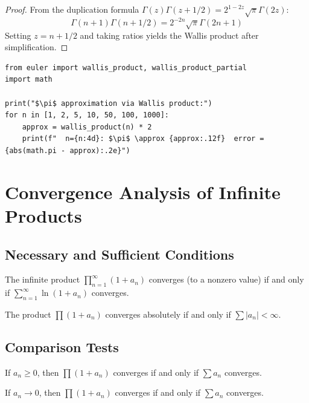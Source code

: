 \begin{proof}
From the duplication formula $\Gamma(z)\Gamma(z+1/2) = 2^{1-2z}\sqrt{\pi}\Gamma(2z)$:
\[
\Gamma(n+1)\Gamma(n+1/2) = 2^{-2n}\sqrt{\pi}\Gamma(2n+1)
\]
Setting $z = n+1/2$ and taking ratios yields the Wallis product after simplification.
\end{proof}

\begin{lstlisting}[caption={Wallis product for $\pi/2$}, label=lst:wallis]
from euler import wallis_product, wallis_product_partial
import math

print("$\pi$ approximation via Wallis product:")
for n in [1, 2, 5, 10, 50, 100, 1000]:
    approx = wallis_product(n) * 2
    print(f"  n={n:4d}: $\pi$ \approx {approx:.12f}  error = {abs(math.pi - approx):.2e}")
\end{lstlisting}

\section{Convergence Analysis of Infinite Products}

\subsection{Necessary and Sufficient Conditions}

\begin{theorem}
The infinite product $\prod_{n=1}^{\infty}(1 + a_n)$ converges (to a nonzero value) if and only if
$\sum_{n=1}^{\infty} \ln(1 + a_n)$ converges.
\end{theorem}

\begin{theorem}
The product $\prod(1 + a_n)$ converges absolutely if and only if $\sum |a_n| < \infty$.
\end{theorem}

\subsection{Comparison Tests}

\begin{theorem}
If $a_n \geq 0$, then $\prod(1 + a_n)$ converges if and only if $\sum a_n$ converges.
\end{theorem}

\begin{theorem}
If $a_n \to 0$, then $\prod(1 + a_n)$ converges if and only if $\sum a_n$ converges.
\end{theorem}

